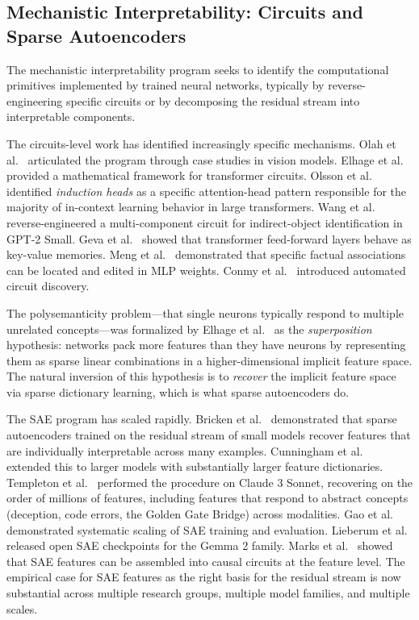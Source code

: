 \subsection{Mechanistic Interpretability: Circuits and Sparse Autoencoders}

The mechanistic interpretability program seeks to identify the
computational primitives implemented by trained neural networks,
typically by reverse-engineering specific circuits or by decomposing
the residual stream into interpretable components.

The circuits-level work has identified increasingly specific mechanisms.
Olah et al.~\cite{olah2020zoom} articulated the program through case
studies in vision models. Elhage et al.~\cite{elhage2021mathematical}
provided a mathematical framework for transformer circuits.
Olsson et al.~\cite{olsson2022context} identified \emph{induction
heads} as a specific attention-head pattern responsible for the
majority of in-context learning behavior in large transformers.
Wang et al.~\cite{wang2023interpretability} reverse-engineered a
multi-component circuit for indirect-object identification in GPT-2
Small. Geva et al.~\cite{geva2021transformer} showed that transformer
feed-forward layers behave as key-value memories. Meng et
al.~\cite{meng2022rome} demonstrated that specific factual associations
can be located and edited in MLP weights. Conmy et
al.~\cite{conmy2023towards} introduced automated circuit discovery.

The polysemanticity problem---that single neurons typically respond to
multiple unrelated concepts---was formalized by Elhage et
al.~\cite{elhage2022superposition} as the \emph{superposition}
hypothesis: networks pack more features than they have neurons by
representing them as sparse linear combinations in a higher-dimensional
implicit feature space. The natural inversion of this hypothesis is to
\emph{recover} the implicit feature space via sparse dictionary
learning, which is what sparse autoencoders do.

The SAE program has scaled rapidly. Bricken et
al.~\cite{bricken2023monosemanticity} demonstrated that sparse
autoencoders trained on the residual stream of small models recover
features that are individually interpretable across many examples.
Cunningham et al.~\cite{cunningham2024sparse} extended this to larger
models with substantially larger feature dictionaries.
Templeton et al.~\cite{templeton2024scaling} performed the procedure on
Claude 3 Sonnet, recovering on the order of millions of features,
including features that respond to abstract concepts (deception, code
errors, the Golden Gate Bridge) across modalities. Gao et
al.~\cite{gao2024scaling} demonstrated systematic scaling of SAE
training and evaluation. Lieberum et al.~\cite{lieberum2024gemma}
released open SAE checkpoints for the Gemma 2 family. Marks et
al.~\cite{marks2024sparse} showed that SAE features can be assembled
into causal circuits at the feature level. The empirical case for SAE
features as the right basis for the residual stream is now substantial
across multiple research groups, multiple model families, and multiple
scales.

